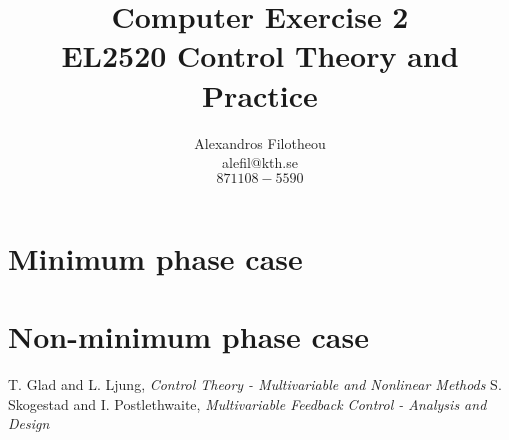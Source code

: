 \documentclass[a4paper,12pt,oneside,onecolumn]{article} %
\title{
	Computer Exercise 2\\
	EL2520 Control Theory and Practice
}
\author{
  Alexandros Filotheou  \\
	alefil@kth.se\\
  $871108-5590$
}
\begin{document}
	\maketitle

	\section*{Minimum phase case}
    

  \newpage

	\section*{Non-minimum phase case}
    

  \begin{thebibliography}{9}
    T. Glad and L. Ljung, \emph{Control Theory - Multivariable and Nonlinear Methods}
    S. Skogestad and I. Postlethwaite, \emph{Multivariable Feedback Control -
    Analysis and Design}
  \end{thebibliography}
\end{document}

